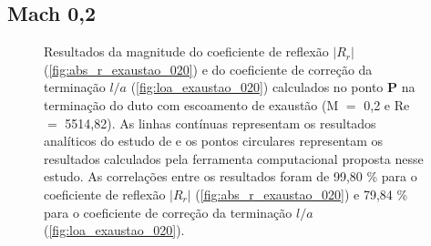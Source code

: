 \newpage
\subsection{Mach 0,2}
\begin{figure}[ht!]
\begin{subfigure}{\scaleA \textwidth}
  
\end{subfigure}%
\begin{subfigure}{\scaleA \textwidth}
  
\end{subfigure}
\caption[Resultados de $|R_{r}|$ e $l/a$ com escoamento de exaustão (M $=$ 0,2 e Re $=$ 5514,82)]{Resultados da magnitude do coeficiente de reflexão $|R_{r}|$ (\ref{fig:abs_r_exaustao_020}) e do coeficiente de correção da terminação $l/a$ (\ref{fig:loa_exaustao_020}) calculados no ponto $\textbf{P}$ na terminação do duto com escoamento de exaustão (M $=$ 0,2 e Re $=$ 5514,82). As linhas contínuas representam os resultados analíticos do estudo de  e os pontos circulares representam os resultados calculados pela ferramenta computacional proposta nesse estudo. As correlações entre os resultados foram de 99,80 \% para o coeficiente de reflexão $|R_{r}|$ (\ref{fig:abs_r_exaustao_020}) e 79,84 \% para o coeficiente de correção da terminação $l/a$ (\ref{fig:loa_exaustao_020}).}
\label{fig:resultados_exaustao_020}
\end{figure}

\newpage
\begin{figure}[ht!]
\centering
  
\end{figure}

\newpage
\begin{figure}[ht!]
\centering
  
\end{figure}



\newpage
